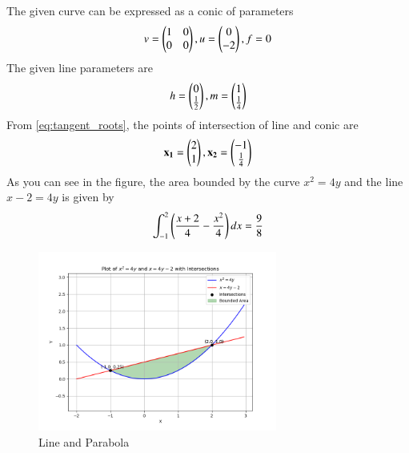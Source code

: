 \documentclass[journal]{IEEEtran}
\begin{document}
The given curve can be expressed as a conic of parameters
\begin{align}
	v=\begin{pmatrix}1&0\\0&0\end{pmatrix}, u=\begin{pmatrix}0\\-2\end{pmatrix}, f=0 
\end{align}
The given line parameters are
\begin{align}
	h=\begin{pmatrix}0\\ \frac{1}{2}\end{pmatrix},  m=\begin{pmatrix}1\\\frac{1}{4}\end{pmatrix}
\end{align}
From \eqref{eq:tangent_roots}, the points of intersection of line and conic are
\begin{align}
	\mathbf{x_1} = \begin{pmatrix}2\\1\end{pmatrix},  \mathbf{x_2} = \begin{pmatrix}-1\\\frac{1}{4}\end{pmatrix}
\end{align}
As you can see in the figure, the area bounded by the curve $x^{2} = 4y$ and the line $x - 2 = 4y $  is given by
\begin{align}
	\int_{-1}^{2} \left(\frac{x + 2}{4} - \frac{x^{2}}{4}\right)dx = \frac{9}{8} 
\end{align}
\newpage
\begin{figure}[h!]
\begin{center}
	\includegraphics[width=0.7\textwidth]{Fig/fig.png}
	\caption{Line and Parabola}
	\label{fig:9-9.2-22 - Figure -1}
\end{center}
\end{figure}
\end{document}
